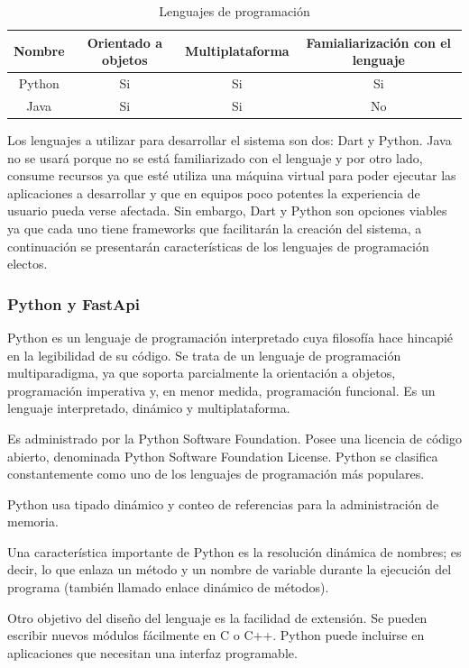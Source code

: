 \begin{table}[!htb]
\begin{tabular}{|c|c|c|c|}
\hline
\rowcolor[HTML]{3531FF} 
{\color[HTML]{FFFFFF} Nombre} & {\color[HTML]{FFFFFF} Orientado a objetos} & {\color[HTML]{FFFFFF} Multiplataforma} & {\color[HTML]{FFFFFF} Famialiarización con el lenguaje} \\ \hline
Python & Si & Si & Si \\ \hline
Java & Si & Si & No \\ \hline
\end{tabular}
\caption{Lenguajes de programación}
\label{table:Programacion}
\end{table}
Los lenguajes a utilizar para desarrollar el sistema son dos: Dart y Python. Java no se usará porque no se está familiarizado con el lenguaje y por otro lado, consume recursos ya que esté utiliza una máquina virtual para poder ejecutar las aplicaciones a desarrollar y que en equipos poco potentes la experiencia de usuario pueda verse afectada. Sin embargo, Dart y Python son opciones viables ya que cada uno tiene frameworks que facilitarán la creación del sistema, a continuación se presentarán características de los lenguajes de programación electos.

\subsubsection{Python y FastApi}
Python es un lenguaje de programación interpretado cuya filosofía hace hincapié en la legibilidad de su código. Se trata de un lenguaje de programación multiparadigma, ya que soporta parcialmente la orientación a objetos, programación imperativa y, en menor medida, programación funcional. Es un lenguaje interpretado, dinámico y multiplataforma.

Es administrado por la Python Software Foundation. Posee una licencia de código abierto, denominada Python Software Foundation License. Python se clasifica constantemente como uno de los lenguajes de programación más populares.

Python usa tipado dinámico y conteo de referencias para la administración de memoria.

Una característica importante de Python es la resolución dinámica de nombres; es decir, lo que enlaza un método y un nombre de variable durante la ejecución del programa (también llamado enlace dinámico de métodos).

Otro objetivo del diseño del lenguaje es la facilidad de extensión. Se pueden escribir nuevos módulos fácilmente en C o C++. Python puede incluirse en aplicaciones que necesitan una interfaz programable.

